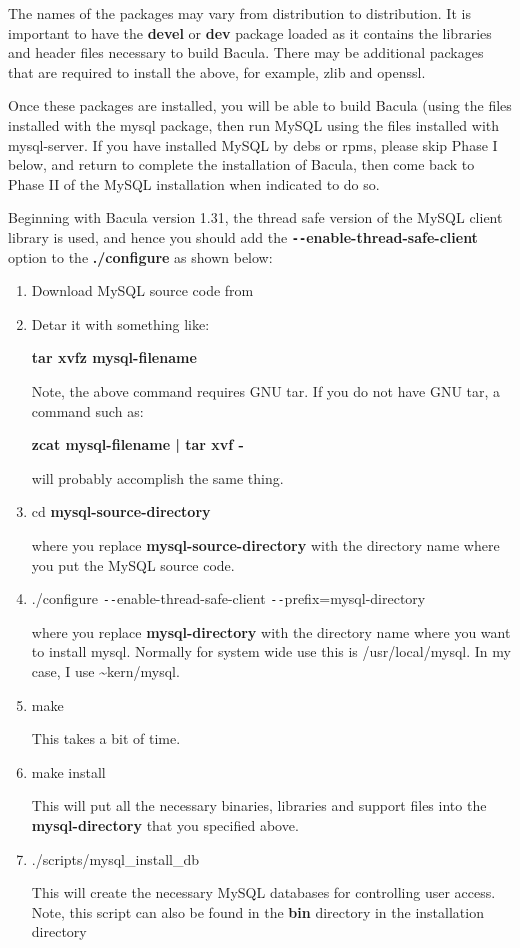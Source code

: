 The names of the packages may vary from distribution to
distribution. It is important to have the {\bf devel} or {\bf dev} package loaded as
it contains the libraries and header files necessary to build
Bacula.  There may be additional packages that are required to 
install the above, for example, zlib and openssl.   

Once these packages are installed, you will be able to build Bacula (using
the files installed with the mysql package, then run MySQL using the
files installed with mysql-server. If you have installed MySQL by debs or rpms,
please skip Phase I below, and return to complete the installation of
Bacula, then come back to Phase II of the MySQL installation when indicated
to do so.

Beginning with Bacula version 1.31, the thread safe version of the
MySQL client library is used, and hence you should add the {\bf
\verb:--:enable-thread-safe-client} option to the {\bf
./configure} as shown below:

\begin{enumerate}
\item Download MySQL source code from 

\item Detar it with something like:

   {\bf tar xvfz mysql-filename}  

Note, the above command requires GNU tar. If you do not  have GNU tar, a
command such as:

{\bf zcat mysql-filename | tar xvf - }  

will probably accomplish the same thing. 

\item cd {\bf mysql-source-directory}

   where you replace {\bf mysql-source-directory} with the  directory name where
   you put the MySQL source code.  

\item ./configure \verb:--:enable-thread-safe-client \verb:--:prefix=mysql-directory

   where you replace {\bf mysql-directory} with the directory  name where you
   want to install mysql. Normally for system  wide use this is /usr/local/mysql.
   In my case, I use  \~{}kern/mysql.  

\item make

   This takes a bit of time.  

\item make install

   This will put all the necessary binaries, libraries and support  files into
   the {\bf mysql-directory} that you specified above.  

\item ./scripts/mysql\_install\_db

   This will create the necessary MySQL databases for controlling  user access.
Note, this script can also be found in the  {\bf bin} directory in the
installation directory 

\end{enumerate}

